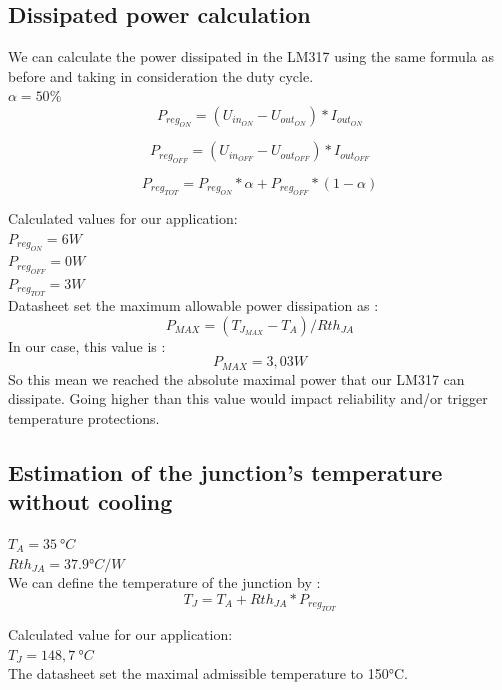 \subsection{Dissipated power calculation} \label{ssec:num14}
{
We can calculate the power dissipated in the LM317 using the same formula as before and taking in consideration the duty cycle. \\
$\alpha = 50\% $ \\

\begin{equation}
	P_{reg_{ON}} = (U_{in_{ON}} - U_{out_{ON}})*I_{out_{ON}}
\end{equation}

\begin{equation}
	P_{reg_{OFF}} = (U_{in_{OFF}} - U_{out_{OFF}})*I_{out_{OFF}}
\end{equation}

\begin{equation}
	P_{reg_{TOT}} = P_{reg_{ON}}*\alpha + P_{reg_{OFF}} * (1-\alpha)
\end{equation}

Calculated values for our application:\\
$ P_{reg_{ON}} = 6 W $ \\
$ P_{reg_{OFF}}  = 0 W $ \\
$ P_{reg_{TOT}} = 3 W $ \\

Datasheet set the maximum allowable power dissipation as : \\
\begin{equation}
	P_{MAX} = (T_{J_{MAX}} - T_{A}) / Rth_{JA}
\end{equation}
In our case, this value is :
\begin{equation}
P_{MAX} = 3,03 W
\end{equation}
So this mean we reached the absolute maximal power that our LM317 can dissipate. Going higher than this value would impact reliability and/or trigger temperature protections.

}

\clearpage

\subsection{Estimation of the junction's temperature without cooling} \label{ssec:num15}
{
$ T_{A} = 35 \ °C $ \\
$ Rth_{JA} = 37.9 °C/W $\\
We can define the temperature of the junction by :
\begin{equation*}
	T_{J} = T_{A} + Rth_{JA} * P_{reg_{TOT}}
\end{equation*}

Calculated value for our application:\\
$ T_{J} = 148,7 \ °C $ \\

The datasheet set the maximal admissible temperature to 150°C.
}
